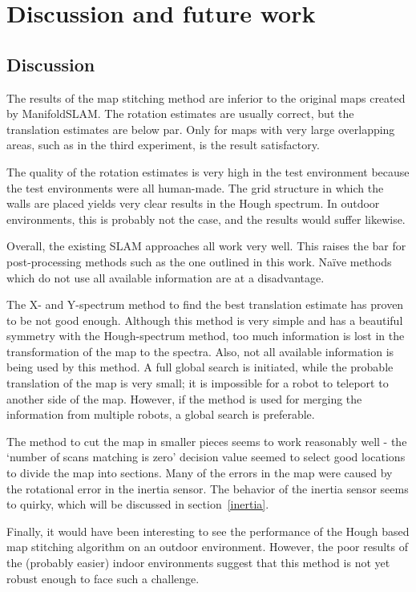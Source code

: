 
\chapter{Discussion and future work}
\label{discussion}

\section{Discussion}
The results of the map stitching method are inferior to the original maps created by ManifoldSLAM. The rotation estimates are usually correct, but the translation estimates are below par. Only for maps with very large overlapping areas, such as in the third experiment, is the result satisfactory.

The quality of the rotation estimates is very high in the test environment because the test environments were all human-made. The grid structure in which the walls are placed yields very clear results in the Hough spectrum. In outdoor environments, this is probably not the case, and the results would suffer likewise.

Overall, the existing SLAM approaches all work very well. This raises the bar for post-processing methods such as the one outlined in this work. Na\"ive methods which do not use all available information are at a disadvantage.

The X- and Y-spectrum method to find the best translation estimate has proven to be not good enough. Although this method is very simple and has a beautiful symmetry with the Hough-spectrum method, too much information is lost in the transformation of the map to the spectra. Also, not all available information is being used by this method. A full global search is initiated, while the probable translation of the map is very small; it is impossible for a robot to teleport to another side of the map. However, if the method is used for merging the information from multiple robots, a global search is preferable. 

The method to cut the map in smaller pieces seems to work reasonably well - the `number of scans matching is zero' decision value seemed to select good locations to divide the map into sections. Many of the errors in the map were caused by the rotational error in the inertia sensor. The behavior of the inertia sensor seems to quirky, which will be discussed in section~\ref{inertia}.

Finally, it would have been interesting to see the performance of the Hough based map stitching algorithm on an outdoor environment. However, the poor results of the (probably easier) indoor environments suggest that this method is not yet robust enough to face such a challenge.

